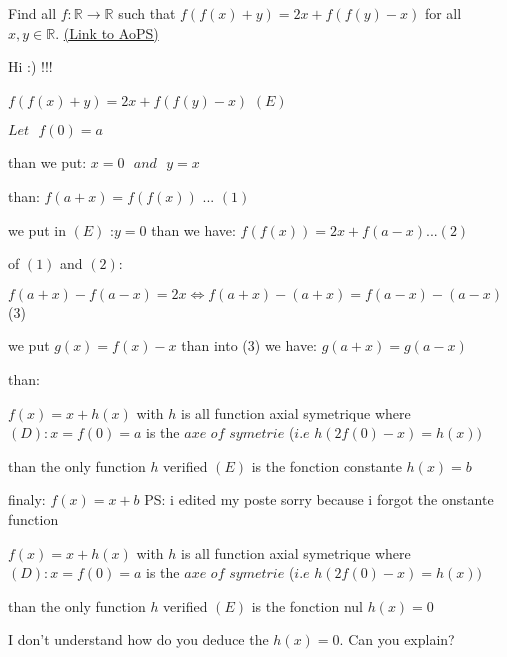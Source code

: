 \begin{problem}
	Find all $f: \mathbb R \to \mathbb R$ such that $ f(f(x) + y) = 2x+ f(f(y) - x)$  for all $ x,y\in \mathbb R$.
	\flushright \href{https://artofproblemsolving.com/community/c6h272194}{(Link to AoPS)}
\end{problem}



\begin{solution}
	Hi :) !!!

$ f(f(x) + y) = 2x + f(f(y) - x)$    $ (E)$

$ Let \ \ \ f(0) = a$

than we put: $ x = 0 \ \ \ and \ \ \ y = x$

than: $ f(a + x) = f(f(x))$ ...  $ (1)$

we put in $ (E)$ :$ y = 0$ than we have: $ f(f(x)) = 2x + f(a - x)$...$ (2)$

of $ (1)$ and $ (2)$:

$ f(a + x) - f(a - x) = 2x \Leftrightarrow f(a + x) - (a + x) = f(a - x) - (a - x)$(3)

we put $ g(x) = f(x) - x$ than  into (3) we have: $ g(a + x) = g(a - x)$

than:

$ f(x) = x + h(x)$ with $ h$ is all function axial symetrique where $ (D): x = f(0) = a$ is the $ axe$ $ of$ $ symetrie$ ($ i.e$ $ h(2f(0) - x) = h(x))$  

than the only function $ h$ verified $ (E)$ is the fonction constante $ h(x) = b$

finaly:
$ f(x) = x+b$ 
PS: i edited my poste sorry because i forgot the onstante function
\end{solution}



\begin{solution}
	\begin{tcolorbox}
$ f(x) = x + h(x)$ with $ h$ is all function axial symetrique where $ (D): x = f(0) = a$ is the $ axe$ $ of$ $ symetrie$ ($ i.e$ $ h(2f(0) - x) = h(x))$  

than the only function $ h$ verified $ (E)$ is the fonction nul $ h(x) = 0$
\end{tcolorbox}I don't understand how do you deduce the $ h(x)=0$. Can you explain?
\end{solution}



